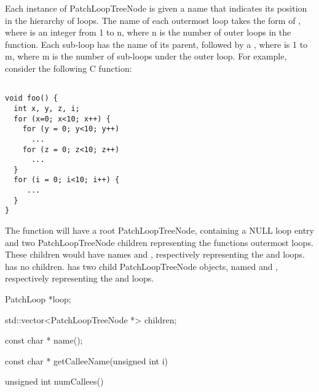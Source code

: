 Each instance of PatchLoopTreeNode is given a name that indicates its position in the hierarchy of loops.
The name of each outermost loop takes the form of , 
where  is an integer from 1 to n,
where n is the number of outer loops in the function.
Each sub-loop has the name of its parent,
followed by a , where  is 1 to m, where m is the number of sub-loops under the outer loop.  
For example, consider the following C function:

\lstset{showstringspaces=false, numbers=none}

\begin{lstlisting}

void foo() {
  int x, y, z, i;
  for (x=0; x<10; x++) {
    for (y = 0; y<10; y++)
      ...
    for (z = 0; z<10; z++)
      ...
  }
  for (i = 0; i<10; i++) {
     ...
  }
}
\end{lstlisting}

The  function will have a root PatchLoopTreeNode, containing a NULL loop entry and 
two PatchLoopTreeNode children representing the functions outermost loops. These children 
would have names  and , respectively representing the  and  loops.  has 
no children.  has two child PatchLoopTreeNode objects, named  and 
, respectively representing the  and  loops. 

\begin{apient}
PatchLoop *loop;
\end{apient}

\begin{apient}
std::vector<PatchLoopTreeNode *> children;
\end{apient}
    
\begin{apient}
const char * name(); 
\end{apient}
    
\begin{apient}
const char * getCalleeName(unsigned int i)
\end{apient}

\begin{apient}
unsigned int numCallees()
\end{apient}    

